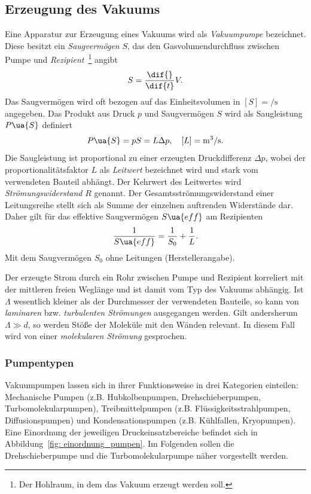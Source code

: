 \subsection{Erzeugung des Vakuums}
Eine Apparatur zur Erzeugung eines Vakuums wird als \emph{Vakuumpumpe} bezeichnet. Diese besitzt ein
\emph{Saugvermögen} $S$, das den Gasvolumendurchfluss zwischen Pumpe und \emph{Rezipient}~\footnote{Der Hohlraum, in dem das Vakuum erzeugt werden soll.}
angibt
\begin{equation}
  S = \frac{\dif{}}{\dif{t}} V.
\end{equation}
Das Saugvermögen wird oft bezogen auf das Einheitsvolumen in $[{S}] = \si{\per \second}$ angegeben.
Das Produkt aus Druck $p$ und Saugvermögen $S$ wird als Saugleistung $P\ua{S}$ definiert
\begin{equation}
  P\ua{S} = p S = L \Delta p , \quad [L] = \si{\meter^3 \per \second}.
\end{equation}
Die Saugleistung ist proportional zu einer erzeugten Druckdifferenz $\Delta p$,
wobei der proportionalitätsfaktor $L$ als \emph{Leitwert} bezeichnet wird und stark vom verwendeten Bauteil abhängt.
Der Kehrwert des Leitwertes wird \emph{Strömungswiderstand} $R$ genannt. Der Gesamtsströmungswiderstand einer Leitungsreihe
stellt sich als Summe der einzelnen auftrenden Widerstände dar. Daher gilt für das effektive Saugvermögen $S\ua{eff}$ am Rezipienten
\begin{equation}
 \frac{1}{S\ua{eff}} = \frac{1}{S_0} + \frac{1}{L}.
 \label{eq: effektives_saugvermögen}
\end{equation}
Mit dem Saugvermögen $S_0$ ohne Leitungen (Herstellerangabe).

Der erzeugte Strom durch ein Rohr zwischen Pumpe und Rezipient korreliert mit der mittleren freien Weglänge
und ist damit vom Typ des Vakuums abhängig. Ist $\Lambda$ wesentlich
kleiner als der Durchmesser der verwendeten Bauteile, so kann von \emph{laminaren} bzw. \emph{turbulenten Strömungen} ausgegangen werden. Gilt andersherum
$\Lambda \gg d$, so werden Stöße der Moleküle mit den Wänden relevant. In diesem Fall wird von einer \emph{molekularen Strömung} gesprochen.


\subsubsection{Pumpentypen}
Vakuumpumpen lassen sich in ihrer Funktionsweise in drei Kategorien einteilen: Mechanische Pumpen (z.B. Hubkolbenpumpen,
Drehschieberpumpen, Turbomolekularpumpen), Treibmittelpumpen (z.B. Flüssigkeitsstrahlpumpen, Diffusionspumpen) und
Kondensationspumpen (z.B. Kühlfallen, Kryopumpen). Eine Einordnung der jeweiligen Druckeinsatzbereiche befindet sich in
Abbildung~\ref{fig: einordnung_pumpen}. Im Folgenden sollen die Drehschieberpumpe und die Turbomolekularpumpe
näher vorgestellt werden.

